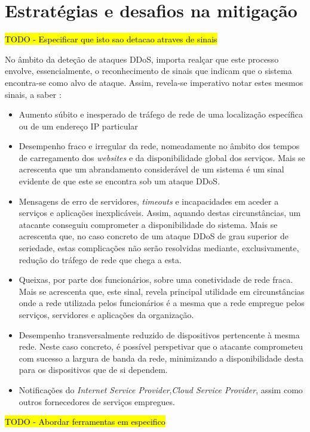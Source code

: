 \section{Estratégias e desafios na mitigação}
\hl{TODO - Especificar que isto sao detacao atraves de sinais}

No âmbito da deteção de ataques DDoS, importa realçar que este processo envolve, essencialmente, o reconhecimento de sinais que indicam que o sistema encontra-se como alvo de ataque. Assim, revela-se imperativo notar estes mesmos sinais, a saber \cite{cybergc_defending_agaisnt_ddos}:
\begin{itemize}
    \item Aumento súbito e inesperado de tráfego de rede de uma localização específica ou de um endereço IP particular
    \item Desempenho fraco e irregular da rede, nomeadamente no âmbito dos tempos de carregamento dos \textit{websites} e da disponibilidade global dos serviços. Mais se acrescenta que um abrandamento considerável de um sistema é um sinal evidente de que este se encontra sob um ataque DDoS.
    \item Mensagens de erro de servidores, \textit{timeouts} e incapacidades em aceder a serviços e aplicações inexplicáveis. Assim, aquando destas circunstâncias, um atacante conseguiu comprometer a disponibilidade do sistema. Mais se acrescenta que, no caso concreto de um ataque DDoS de grau superior de seriedade, estas complicações não serão resolvidas mediante, exclusivamente, redução do tráfego de rede que chega a esta.
    \item Queixas, por parte dos funcionários, sobre uma conetividade de rede fraca. Mais se acrescenta que, este sinal, revela principal utilidade em circunstâncias onde a rede utilizada pelos funcionários é a mesma que a rede empregue pelos serviços, servidores e aplicações da organização.
    \item Desempenho transversalmente reduzido de dispositivos pertencente à mesma rede. Neste caso concreto, é possível perspetivar que o atacante comprometeu com sucesso a largura de banda da rede, minimizando a disponibilidade desta para os dispositivos que de si dependem.
    \item Notificações do \textit{Internet Service Provider},\textit{Cloud Service Provider}, assim como outros fornecedores de serviços empregues.
\end{itemize}

\hl{TODO - Abordar ferramentas em especifico}



